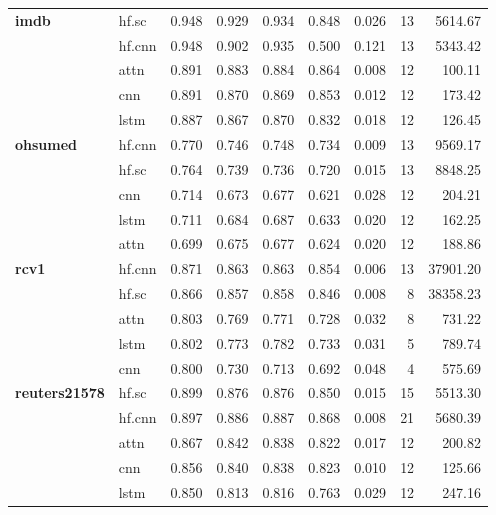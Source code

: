 \documentclass[final]{clv2025}
\begin{document}
\begin{table}[h!]
\begin{tabular}{@{}p{2cm}p{1.2cm}rrrrrrr@{}}
\midrule
\textbf{imdb} & hf.sc & 0.948 & 0.929 & 0.934 & 0.848 & 0.026 & 13 & 5614.67 \\
 & hf.cnn & 0.948 & 0.902 & 0.935 & 0.500 & 0.121 & 13 & 5343.42 \\
 & attn & 0.891 & 0.883 & 0.884 & 0.864 & 0.008 & 12 & 100.11 \\
 & cnn & 0.891 & 0.870 & 0.869 & 0.853 & 0.012 & 12 & 173.42 \\
 & lstm & 0.887 & 0.867 & 0.870 & 0.832 & 0.018 & 12 & 126.45 \\
\midrule
\textbf{ohsumed} & hf.cnn & 0.770 & 0.746 & 0.748 & 0.734 & 0.009 & 13 & 9569.17 \\
 & hf.sc & 0.764 & 0.739 & 0.736 & 0.720 & 0.015 & 13 & 8848.25 \\
 & cnn & 0.714 & 0.673 & 0.677 & 0.621 & 0.028 & 12 & 204.21 \\
 & lstm & 0.711 & 0.684 & 0.687 & 0.633 & 0.020 & 12 & 162.25 \\
 & attn & 0.699 & 0.675 & 0.677 & 0.624 & 0.020 & 12 & 188.86 \\
\midrule
\textbf{rcv1} & hf.cnn & 0.871 & 0.863 & 0.863 & 0.854 & 0.006 & 13 & 37901.20 \\
 & hf.sc & 0.866 & 0.857 & 0.858 & 0.846 & 0.008 & 8 & 38358.23 \\
 & attn & 0.803 & 0.769 & 0.771 & 0.728 & 0.032 & 8 & 731.22 \\
 & lstm & 0.802 & 0.773 & 0.782 & 0.733 & 0.031 & 5 & 789.74 \\
 & cnn & 0.800 & 0.730 & 0.713 & 0.692 & 0.048 & 4 & 575.69 \\
\midrule
\textbf{reuters21578} & hf.sc & 0.899 & 0.876 & 0.876 & 0.850 & 0.015 & 15 & 5513.30 \\
 & hf.cnn & 0.897 & 0.886 & 0.887 & 0.868 & 0.008 & 21 & 5680.39 \\
 & attn & 0.867 & 0.842 & 0.838 & 0.822 & 0.017 & 12 & 200.82 \\
 & cnn & 0.856 & 0.840 & 0.838 & 0.823 & 0.010 & 12 & 125.66 \\
 & lstm & 0.850 & 0.813 & 0.816 & 0.763 & 0.029 & 12 & 247.16 \\
\bottomrule
\end{tabular}
\end{table}
\end{document}

